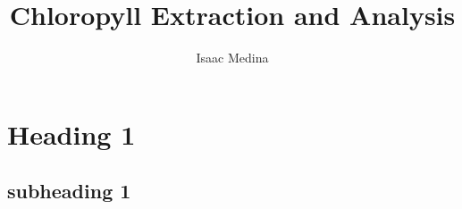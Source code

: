 \documentclass{article}
\title{Chloropyll Extraction and Analysis}
\author{Isaac Medina}
\begin{document}


\maketitle

\section{Heading 1}

\subsection{subheading 1}
\end{document}
